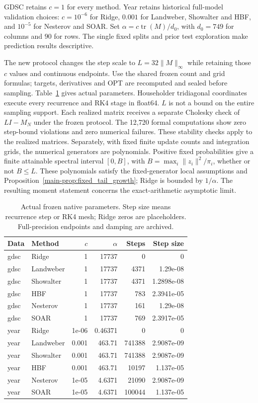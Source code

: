 \documentclass[11pt,a4paper,leqno]{article}
\numberwithin{equation}{section}
\numberwithin{figure}{section}
\numberwithin{table}{section}
\theoremstyle{plain}
\theoremstyle{definition}
\theoremstyle{remark}
\begin{document}
GDSC retains $c=1$ for every method. Year retains historical full-model
validation choices: $c=10^{-6}$ for Ridge, $0.001$ for Landweber,
Showalter and HBF, and $10^{-5}$ for Nesterov and SOAR. Set
$\alpha=c\operatorname{tr}(M)/d_0$, with $d_0=749$ for columns and
$90$ for rows. The single fixed splits and prior test exploration make
prediction results descriptive.

The new protocol changes the step scale to $L=32\|M\|_\infty$ while
retaining those $c$ values and continuous endpoints. Use the shared frozen
count and grid formulas; targets, derivatives and OPT are recomputed and
sealed before sampling. Table~\ref{tab:rd_min_parameters} gives actual
parameters. Householder tridiagonal coordinates execute every recurrence
and RK4 stage in float64. $L$ is not a bound on the entire sampling
support. Each realized matrix receives a separate Cholesky check of
$LI-M_N$ under the frozen protocol. The 12,720 formal computations show
zero step-bound violations and zero numerical failures. These stability
checks apply to the realized matrices.
Separately, with fixed finite update counts and integration grids, the
numerical generators are polynomials. Positive fixed probabilities give a finite
attainable spectral interval $[0,B]$, with
$B=\max_i\|z_i\|^2/\pi_i$, whether or not $B\le L$.
These polynomials satisfy the fixed-generator local assumptions and
Proposition~\ref{main-prop:fixed_tail_growth}; Ridge is bounded by $1/\alpha$.
The resulting moment statement concerns the exact-arithmetic asymptotic limit.

\begin{table}[!htbp]\centering\small
\setlength{\tabcolsep}{4pt}
\caption{Actual frozen native parameters. Step size means recurrence step or RK4 mesh; Ridge zeros are placeholders. Full-precision endpoints and damping are archived.}
\label{tab:rd_min_parameters}
\begin{tabular}{llrrrr}\toprule
Data & Method & $c$ & $\alpha$ & Steps & Step size \\\midrule
gdsc & Ridge & 1 & 17737 & 0 & 0 \\
gdsc & Landweber & 1 & 17737 & 4371 & 1.29e-08 \\
gdsc & Showalter & 1 & 17737 & 4371 & 1.2898e-08 \\
gdsc & HBF & 1 & 17737 & 783 & 2.3941e-05 \\
gdsc & Nesterov & 1 & 17737 & 161 & 1.29e-08 \\
gdsc & SOAR & 1 & 17737 & 769 & 2.3917e-05 \\
year & Ridge & 1e-06 & 0.46371 & 0 & 0 \\
year & Landweber & 0.001 & 463.71 & 741388 & 2.9087e-09 \\
year & Showalter & 0.001 & 463.71 & 741388 & 2.9087e-09 \\
year & HBF & 0.001 & 463.71 & 10197 & 1.137e-05 \\
year & Nesterov & 1e-05 & 4.6371 & 21090 & 2.9087e-09 \\
year & SOAR & 1e-05 & 4.6371 & 100044 & 1.137e-05 \\
\bottomrule\end{tabular}
\end{table}
\end{document}

